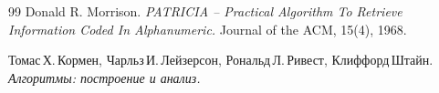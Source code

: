 \begin{thebibliography}{99}
Donald R. Morrison.
{\itshape PATRICIA -- Practical Algorithm To Retrieve Information Coded In Alphanumeric.}
Journal of the ACM, 15(4), 1968.

Томас\,Х.\,Кормен, Чарльз\,И.\,Лейзерсон, Рональд\,Л.\,Ривест, Клиффорд\,Штайн.
{\itshape Алгоритмы: построение и анализ.}
\end{thebibliography}
\pagebreak
